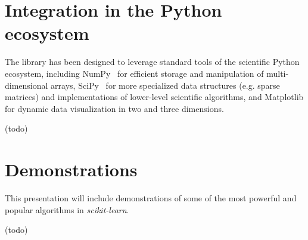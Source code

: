 \documentclass{article}
\newcommand{\sklearn}{\textit{scikit-learn}\xspace}
\DeclareRobustCommand{\VAN}[3]{#2}
\begin{document}
\section*{Integration in the Python ecosystem}

The library has been designed to leverage standard tools of the scientific
Python ecosystem, including NumPy~\citep{vanderwalt2011} for efficient  storage
and manipulation of multi-dimensional arrays, SciPy~\citep{varoquaux2013scipy}
for more specialized data structures  (e.g. sparse matrices) and
implementations of lower-level scientific algorithms, and Matplotlib for
dynamic data visualization in two and three dimensions.

(todo)


\section*{Demonstrations}

This presentation will include demonstrations of some of the most powerful and
popular algorithms in \sklearn.

(todo)



\DeclareRobustCommand{\VAN}[3]{#3}

\end{document}
